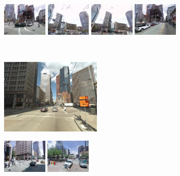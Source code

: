 \begin{figure}[h]
\begin{minipage}{0.75\linewidth}
\begin{minipage}{\linewidth}
              \colorbox{myRed}{\includegraphics[height=16mm]{imgs/ex1/FV1.jpg}}
              \colorbox{myRed}{\includegraphics[height=16mm]{imgs/ex1/FV2.jpg}}
              \colorbox{myRed}{\includegraphics[height=16mm]{imgs/ex1/FV3.jpg}}
              \colorbox{myRed}{\includegraphics[height=16mm]{imgs/ex1/FV4.jpg}}
          \end{minipage} 
      \end{minipage}
      \\
      \begin{minipage}{0.34\linewidth}
          \centering
          \vspace{0mm}
          \includegraphics[height=36mm]{imgs/ex2/query.jpg}
      \end{minipage}
      \begin{minipage}{0.75\linewidth}
          \begin{minipage}{\linewidth} 
              \colorbox{myGreen}{\includegraphics[height=16mm]{imgs/ex2/FVsvm1.jpg}}
              \colorbox{myGreen}{\includegraphics[height=16mm]{imgs/ex2/FVsvm2.jpg}}

\end{minipage}
\end{minipage}
\end{figure}
